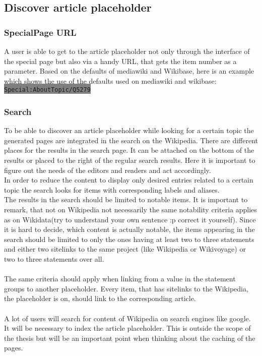\documentclass[11pt]{article}
\begin{document}
\subsection{Discover article placeholder}
\subsubsection{SpecialPage URL}
A user is able to get to the article placeholder not only through the interface of the special page but also via a handy URL, that gets the item number as a parameter. Based on the defaults of mediawiki and Wikibase, here is an example which shows the use of the defaults used on mediawiki and wikibase: \colorbox{Gray}{\lstinline[basicstyle=\ttfamily\color{white}]|Special:AboutTopic/Q5279|} \\

\subsubsection{Search}
To be able to discover an article placeholder while looking for a certain topic the generated pages are integrated in the search on the Wikipedia. There are different places for the results in the search page. It can be attached on the bottom of the results or placed to the right of the regular search results. Here it is important to figure out the needs of the editors and readers and act accordingly. \\
In order to reduce the content to display only desired entries related to a certain topic the search looks for items with corresponding labels and aliases. \\
The results in the search should be limited to notable items. It is important to remark, that not on Wikipedia not necessarily the same notability criteria applies as on Wikidata(try to understand your own sentence :p correct it yourself). Since it is hard to decide, which content is actually notable, the items appearing in the search should be limited to only the ones having at least two to three statements and either two sitelinks to the same project (like Wikipedia or Wikivoyage) or two to three statements over all. \\
\\
The same criteria should apply when linking from a value in the statement groups to another placeholder. Every item, that has sitelinks to the Wikipedia, the placeholder is on, should link to the corresponding article.  \\
\\
A lot of users will search for content of Wikipedia on search engines like google. It will be necessary to index the article placeholder. This is outside the scope of the thesis but will be an important point when thinking about the caching of the pages. 
\end{document}
